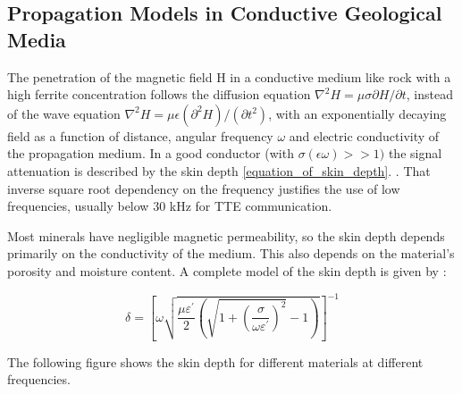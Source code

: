

\subsection{Propagation Models in Conductive Geological Media}\label{subsec:propagation-models}


The penetration of the magnetic field H in a conductive medium like rock with a high ferrite concentration follows the diffusion equation $\nabla^{2}H=\mu\sigma\partial H/\partial t$, instead of the wave equation $\nabla^{2}H=\mu\epsilon(\partial^{2}H)/(\partial t^{2})$, with an exponentially decaying field as a function of distance, angular frequency $\omega$ and electric conductivity of the propagation medium. In a good conductor (with $\sigma(\epsilon\omega)>>1)$ the signal attenuation is described by the skin depth \ref{equation_of_skin_depth}.  \cite{carreno2016through}. That inverse square root dependency on the frequency justifies the use of low frequencies, usually below 30 kHz for TTE communication.

\newp
Most minerals have negligible magnetic permeability, so the skin depth depends primarily on the conductivity of the medium. This also depends on the material's porosity and moisture content. A complete model of the skin depth is given by \cite{abrudan2016impactrocksmineralsunderground}:

\begin{equation}
    \delta = \left[ \omega \sqrt{ \frac{\mu \varepsilon^{\prime}}{2} \left( \sqrt{1 + \left( \frac{\sigma}{\omega \varepsilon^{\prime}} \right)^{2}} - 1 \right)} \right]^{ -1 }
\end{equation}

The following  figure shows the skin depth for different materials at different frequencies.

